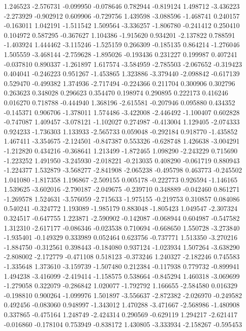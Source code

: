 1.246523
-2.576731
-0.099950
-0.078646
0.782944
-0.819124
1.498712
-3.436223
-2.273929
-0.902912
0.609906
-0.729756
1.439598
-3.088596
-1.468741
0.240157
-0.163011
1.042191
-1.511542
1.509564
-3.336257
-1.806780
-0.241412
0.250410
0.104972
0.587295
-0.367627
1.104386
-1.915620
0.934201
-2.137822
0.788591
-1.403924
1.444462
-3.115246
-1.525159
0.266309
-0.185135
0.864214
-1.276046
1.505559
-3.468144
-2.759628
-1.895026
-0.193436
0.231227
0.199987
0.407241
-0.037810
0.890337
-1.261897
1.617574
-3.584959
-2.785503
-2.067652
-0.319423
0.404041
-0.246223
0.951267
-1.453865
1.323886
-3.379440
-2.098842
-0.617139
0.529470
-0.499382
1.374936
-2.717494
-0.224366
0.211704
0.300906
0.302796
0.263623
0.348028
0.296623
0.354470
0.198974
0.290895
0.222173
0.416246
0.016270
0.718788
-0.444940
1.368196
-2.615581
-0.207946
0.095880
0.434352
-0.145371
0.906706
-1.378011
1.574486
-3.422008
-2.446492
-1.100407
0.602828
-0.747087
1.409457
-3.078121
-1.102027
0.274987
-0.413004
1.129405
-2.074333
0.924233
-1.736303
1.133933
-2.565733
0.059048
-0.292184
0.918770
-1.435852
1.467411
-3.354675
-2.124501
-0.847387
0.553326
-0.628748
1.426638
-3.004291
-1.212820
0.434216
-0.368641
1.213499
-1.872465
1.098290
-2.243229
0.715690
-1.223252
1.491950
-3.245930
-2.018221
-0.213035
0.408290
-0.061719
0.880943
-1.224377
1.532879
-3.568277
-2.841908
-2.065238
-0.495798
0.463773
-0.245502
1.041080
-1.817358
1.196867
-2.509155
0.005178
-0.222773
0.926594
-1.146165
1.539625
-3.602016
-2.790187
-2.049675
-0.239710
0.348889
-0.042460
0.861271
-1.269578
1.524631
-3.576059
-2.715633
-1.975155
-0.219753
0.310857
0.084086
0.540241
-0.324772
1.193089
-1.985179
0.883048
-1.805423
1.049547
-2.307324
0.324517
-0.647755
1.223871
-2.590902
-0.142087
-0.068944
0.604987
-0.547582
1.312310
-2.617177
-0.086346
-0.023538
0.710694
-0.668650
1.550728
-3.273840
-1.935401
-0.149329
0.333989
0.052464
0.623756
-0.737771
1.513350
-3.270216
-1.884750
-0.312561
0.398443
-0.184080
0.937124
-1.023934
1.507264
-3.638290
-2.808002
-2.172779
-0.471108
0.518123
-0.373246
1.240327
-2.182246
0.745583
-1.335648
1.373610
-3.159739
-1.507480
0.212384
-0.117938
0.779732
-0.899941
1.494238
-3.416099
-2.419414
-1.158575
0.538664
-0.845294
1.460318
-3.069699
-1.279058
0.322079
-0.286842
1.020077
-1.792792
1.166655
-2.584580
0.016329
-0.198810
0.900264
-1.099976
1.501897
-3.556637
-2.872382
-2.026970
-0.249582
0.492456
-0.083060
0.948997
-1.343012
1.470288
-3.471667
-2.568986
-1.480908
0.337865
-0.475164
1.248749
-2.424314
0.290569
-0.629119
1.294217
-2.621417
-0.016860
-0.178104
0.753949
-0.838172
1.430805
-3.333934
-2.158267
-0.595453
